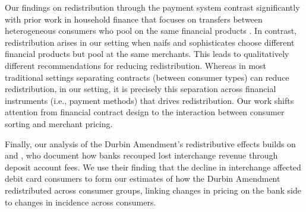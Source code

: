 \documentclass[main.tex]{subfiles}
\begin{document}
Our findings on redistribution through the payment system contrast significantly with prior work in household finance that focuses on transfers between heterogeneous consumers who pool on the same financial products \citep{Gabaix.Laibson2006, Fisher.etal2024, Agarwal.etal2025}.
In contrast, redistribution arises in our setting when naifs and sophisticates choose different financial products but pool at the same merchants.
This leads to qualitatively different recommendations for reducing redistribution.
Whereas in most traditional settings separating contracts (between consumer types) can reduce redistribution, in our setting, it is precisely this separation across financial instruments (i.e., payment methods) that drives redistribution. 
Our work shifts attention from financial contract design to the interaction between consumer sorting and merchant pricing.

Finally, our analysis of the Durbin Amendment's redistributive effects builds on \citet{Kay.etal2018} and \citet{Mukharlyamov.Sarin2025}, who document how banks recouped lost interchange revenue through deposit account fees. We use their finding that the decline in interchange affected debit card consumers to form our estimates of how the Durbin Amendment redistributed across consumer groups, linking changes in pricing on the bank side to changes in incidence across consumers.
\end{document}
